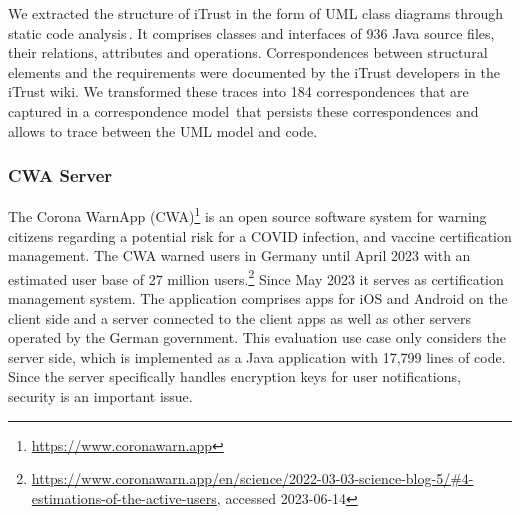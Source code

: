 We extracted the structure of iTrust in the form of UML class diagrams through static code analysis\,\cite{Peldszus2022,gravity}. It comprises classes and interfaces of 936 Java source files, their relations, attributes and operations. Correspondences between structural elements and the requirements were documented by the iTrust developers in the iTrust wiki.
We transformed these traces into 184 correspondences that are captured in a correspondence model\,\cite{schurr1994specification} that persists these correspondences and allows to trace between the UML model and code.


\subsubsection{CWA Server}

The Corona WarnApp (CWA)\footnote{\url{https://www.coronawarn.app}} is an open source software system for warning citizens regarding a potential risk for a COVID infection, and vaccine certification management.
The CWA warned users in Germany until April 2023 with an estimated user base of 27 million users.\footnote{\url{https://www.coronawarn.app/en/science/2022-03-03-science-blog-5/\#4-estimations-of-the-active-users}, accessed 2023-06-14} Since May 2023 it serves as certification management system.
The application comprises apps for iOS and Android on the client side and a server connected to the client apps as well as other servers operated by the German government.
This evaluation use case only considers the server side, which is implemented as a Java application with 17,799 lines of code.
Since the server specifically handles encryption keys for user notifications, security is an important issue.

